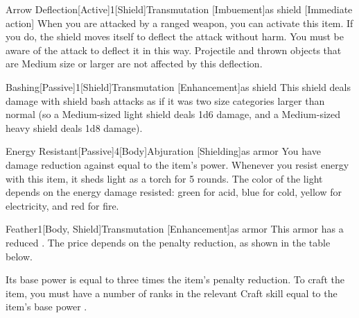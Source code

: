        \begin{magicitemdef}{Arrow Deflection}[Active]{1}[Shield]{Transmutation [Imbuement]}{as shield}
            [Immediate action] When you are attacked by a ranged weapon, you can activate this item.
            If you do, the shield moves itself to deflect the attack without harm.
            You must be aware of the attack to deflect it in this way.
            Projectile and thrown objects that are Medium size or larger are not affected by this deflection.
        \end{magicitemdef}

        \begin{magicitemdef}{Bashing}[Passive]{1}[Shield]{Transmutation [Enhancement]}{as shield}
             This shield deals damage with shield bash attacks as if it was two size categories larger than normal (so a Medium-sized light shield deals 1d6 damage, and a Medium-sized heavy shield deals 1d8 damage).
        \end{magicitemdef}

        \begin{magicitemdef}{Energy Resistant}[Passive]{4}[Body]{Abjuration [Shielding]}{as armor}
             You have damage reduction against  equal to the item's power.
            Whenever you resist energy with this item, it sheds light as a torch for 5 rounds.
            The color of the light depends on the energy damage resisted: green for acid, blue for cold, yellow for electricity, and red for fire.
        \end{magicitemdef}

        \begin{magicitemdef}{Feather}{1}[Body, Shield]{Transmutation [Enhancement]}{as armor}
             This armor has a reduced .
            The price depends on the penalty reduction, as shown in the table below.

            Its base power is equal to three times the item's penalty reduction.
            To craft the item, you must have a number of ranks in the relevant Craft skill equal to the item's base power .
        \end{magicitemdef}

